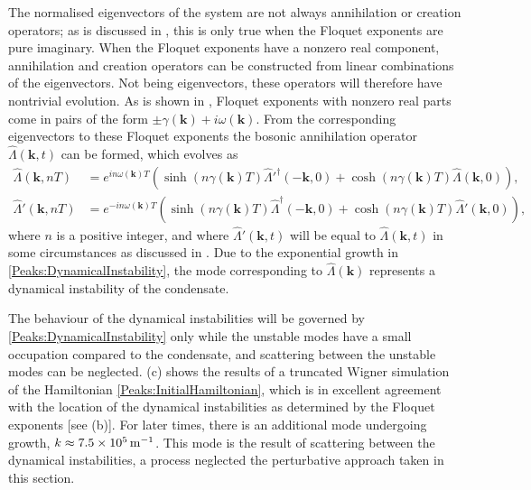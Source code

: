 The normalised eigenvectors of the system are not always annihilation or creation operators; as is discussed in , this is only true when the Floquet exponents are pure imaginary. When the Floquet exponents have a nonzero real component, annihilation and creation operators can be constructed from linear combinations of the eigenvectors. Not being eigenvectors, these operators will therefore have nontrivial evolution. As is shown in , Floquet exponents with nonzero real parts come in pairs of the form $\pm \gamma(\bm{k}) + i \omega(\bm{k})$. From the corresponding eigenvectors to these Floquet exponents the bosonic annihilation operator $\hat{\Lambda}(\bm{k}, t)$ can be formed, which evolves as
\begin{subequations}
    \label{Peaks:DynamicalInstability}
    \begin{align}
        \hat{\Lambda}(\bm{k}, nT) &= e^{i n\omega(\bm{k}) T} \left( \sinh(n\gamma(\bm{k}) T) \hat{\Lambda}'^\dagger(-\bm{k}, 0) + \cosh(n\gamma(\bm{k}) T) \hat{\Lambda}(\bm{k}, 0)\right),\\
        \hat{\Lambda}'(\bm{k}, nT) &= e^{-i n \omega(\bm{k}) T} \left( \sinh(n\gamma(\bm{k}) T) \hat{\Lambda}^\dagger(-\bm{k}, 0) + \cosh(n\gamma(\bm{k}) T) \hat{\Lambda}'(\bm{k}, 0)\right),
    \end{align}
\end{subequations}
where $n$ is a positive integer, and where $\hat{\Lambda}'(\bm{k}, t)$ will be equal to $\hat{\Lambda}(\bm{k}, t)$ in some circumstances as discussed in . Due to the exponential growth in \eqref{Peaks:DynamicalInstability}, the mode corresponding to $\hat{\Lambda}(\bm{k})$ represents a dynamical instability of the condensate.

The behaviour of the dynamical instabilities will be governed by \eqref{Peaks:DynamicalInstability} only while the unstable modes have a small occupation compared to the condensate, and scattering between the unstable modes can be neglected. (c) shows the results of a truncated Wigner simulation of the Hamiltonian \eqref{Peaks:InitialHamiltonian}, which is in excellent agreement with the location of the dynamical instabilities as determined by the Floquet exponents [see (b)]. For later times, there is an additional mode undergoing growth, $k \approx \unit[7.5\times 10^5]{m}^{-1}$. This mode is the result of scattering between the dynamical instabilities, a process neglected the perturbative approach taken in this section. 

